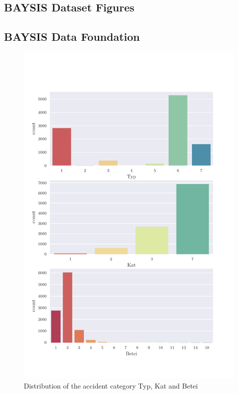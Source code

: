 \documentclass[a4paper,headsepline,footsepline,fontsize=11pt,BCOR=12mm,DIV=12]{report}
\newcommand{\nocontentsline}[3]{}
\newcommand{\tocless}[2]{\bgroup\let\addcontentsline=\nocontentsline#1{#2}\egroup}
\begin{document}
\begin{appendices}


\chapter{BAYSIS Dataset Figures}
\label{appendix_baysis}

\tocless\section{BAYSIS Data Foundation}
\label{appendix_baysis_dataset}

\begin{figure}[h]
	\centering
	\includegraphics[scale=0.7]{../CorrAnalysis/data/BAYSIS/01_dataset/plots/baysis_dataset_count_multiple01}
	\caption{Distribution of the accident category Typ, Kat and Betei}
	\label{img:appendix_baysis_dataset_01}
\end{figure}


\end{appendices}
\end{document}
